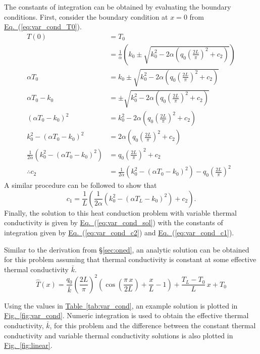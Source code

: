 \documentclass{article}
\newcommand{\kbar}{\bar{k}}
\newcommand{\that}{\hat{T}}
\newcommand{\eref}[1]{\hyperref[#1]{Eq.~}(\ref{#1})}
\newcommand{\fref}[1]{\hyperref[#1]{Fig.~}\ref{#1}}
\newcommand{\tref}[1]{\hyperref[#1]{Table~}\ref{#1}}
\newcommand{\sref}[1]{\hyperref[#1]{\S}\ref{#1}}
\begin{document}
The constants of integration can be obtained by evaluating the boundary conditions.
First, consider the boundary condition at $x=0$ from \eref{eq:var_cond_T0}.
\begin{align}
  T(0) &= T_0 \\
  &= \frac{1}{\alpha} \left( k_0 \pm \sqrt{k_0^2 - 2 \alpha \left( q_0 \left( \frac{2L}{\pi} \right)^2 + c_2 \right)}\right) \\
  \alpha T_0 &= k_0 \pm \sqrt{k_0^2 - 2 \alpha \left( q_0 \left( \frac{2L}{\pi} \right)^2 + c_2 \right)} \\
  \alpha T_0 - k_0 &= \pm \sqrt{k_0^2 - 2 \alpha \left( q_0 \left( \frac{2L}{\pi} \right)^2 + c_2 \right)} \\
  (\alpha T_0 - k_0)^2 &= k_0^2 - 2 \alpha \left( q_0 \left( \frac{2L}{\pi} \right)^2 + c_2 \right) \\
  k_0^2 - (\alpha T_0 - k_0)^2 &= 2 \alpha \left( q_0 \left( \frac{2L}{\pi} \right)^2 + c_2 \right) \\
  \frac{1}{2\alpha} (k_0^2 - (\alpha T_0 - k_0)^2) &= q_0 \left( \frac{2L}{\pi} \right)^2 + c_2 \\
  \label{eq:var_cond_c2}
  \therefore c_2 &= \frac{1}{2\alpha} (k_0^2 - (\alpha T_0 - k_0)^2) - q_0 \left( \frac{2L}{\pi} \right)^2
\end{align}
A similar procedure can be followed to show that
\begin{equation}
  \label{eq:var_cond_c1}
  c_1 = \frac{1}{L} \left( \frac{1}{2\alpha} (k_0^2 - (\alpha T_L - k_0)^2) + c_2 \right).
\end{equation}
Finally, the solution to this heat conduction problem with variable thermal conductivity is given by \eref{eq:var_cond_sol} with the constants of integration given by \eref{eq:var_cond_c2} and \eref{eq:var_cond_c1}.

Similar to the derivation from \sref{sec:oned}, an analytic solution can be obtained for this problem assuming that thermal conductivity is constant at some effective thermal conductivity $\kbar$.
\begin{equation}
  \that(x) = \frac{q_0}{\kbar} \left( \frac{2L}{\pi} \right)^2 \left( \cos \left( \frac{\pi \, x}{2L} \right) + \frac{x}{L} - 1 \right) + \frac{T_L-T_0}{L} \, x + T_0
\end{equation}

Using the values in \tref{tab:var_cond}, an example solution is plotted in \fref{fig:var_cond}.
Numeric integration is used to obtain the effective thermal conductivity, $\kbar$, for this problem and the difference between the constant thermal conductivity and variable thermal conductivity solutions is also plotted in \fref{fig:linear}.
\end{document}
